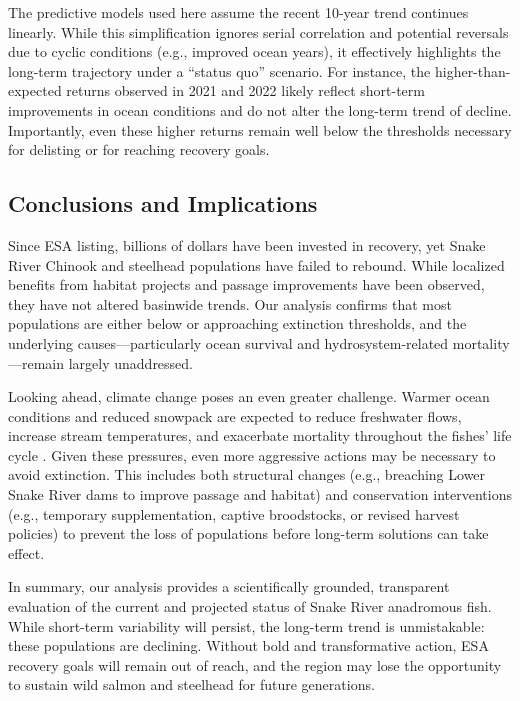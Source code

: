 \documentclass[12pt,a4paper]{article}
\begin{document}
The predictive models used here assume the recent 10-year trend continues linearly. While this simplification ignores serial correlation and potential reversals due to cyclic conditions (e.g., improved ocean years), it effectively highlights the long-term trajectory under a ``status quo'' scenario. For instance, the higher-than-expected returns observed in 2021 and 2022 likely reflect short-term improvements in ocean conditions and do not alter the long-term trend of decline. Importantly, even these higher returns remain well below the thresholds necessary for delisting or for reaching recovery goals.

\subsection{Conclusions and Implications}\label{conclusions-and-implications}

Since ESA listing, billions of dollars have been invested in recovery, yet Snake River Chinook and steelhead populations have failed to rebound. While localized benefits from habitat projects and passage improvements have been observed, they have not altered basinwide trends. Our analysis confirms that most populations are either below or approaching extinction thresholds, and the underlying causes---particularly ocean survival and hydrosystem-related mortality---remain largely unaddressed.

Looking ahead, climate change poses an even greater challenge. Warmer ocean conditions and reduced snowpack are expected to reduce freshwater flows, increase stream temperatures, and exacerbate mortality throughout the fishes' life cycle \autocite{crozier_climate_2019,crozier_climate_2021}. Given these pressures, even more aggressive actions may be necessary to avoid extinction. This includes both structural changes (e.g., breaching Lower Snake River dams to improve passage and habitat) and conservation interventions (e.g., temporary supplementation, captive broodstocks, or revised harvest policies) to prevent the loss of populations before long-term solutions can take effect.

In summary, our analysis provides a scientifically grounded, transparent evaluation of the current and projected status of Snake River anadromous fish. While short-term variability will persist, the long-term trend is unmistakable: these populations are declining. Without bold and transformative action, ESA recovery goals will remain out of reach, and the region may lose the opportunity to sustain wild salmon and steelhead for future generations.
\end{document}
